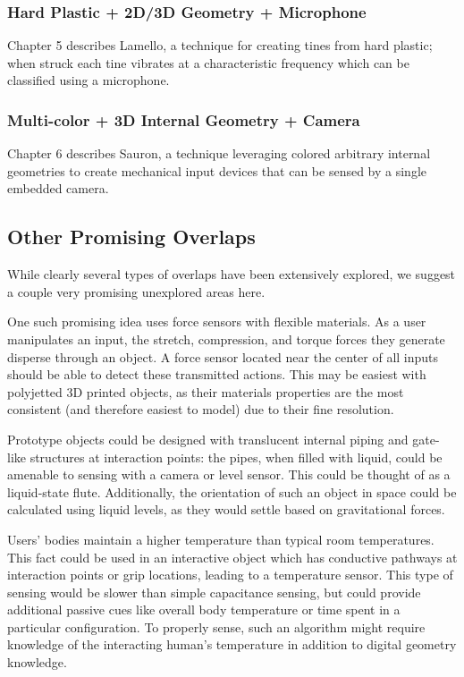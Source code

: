    \subsubsection{Hard Plastic + 2D/3D Geometry + Microphone}
    
    Chapter 5 describes Lamello, a technique for creating tines from hard plastic; when struck each tine vibrates at a characteristic frequency which can be classified using a microphone.
    
    \subsubsection{Multi-color + 3D Internal Geometry + Camera}
    
    Chapter 6 describes Sauron, a technique leveraging colored arbitrary internal geometries to create mechanical input devices that can be sensed by a single embedded camera.

\subsection{Other Promising Overlaps}

    While clearly several types of overlaps have been extensively explored, we suggest a couple very promising unexplored areas here.
    
    One such promising idea uses force sensors with flexible materials. As a user manipulates an input, the stretch, compression, and torque forces they generate disperse through an object. A force sensor located near the center of all inputs should be able to detect these transmitted actions. This may be easiest with polyjetted 3D printed objects, as their materials properties are the most consistent (and therefore easiest to model) due to their fine resolution.
    
    Prototype objects could be designed with translucent internal piping and gate-like structures at interaction points: the pipes, when filled with liquid, could be amenable to sensing with a camera or level sensor. This could be thought of as a liquid-state flute. Additionally, the orientation of such an object in space could be calculated using liquid levels, as they would settle based on gravitational forces.
    
    Users' bodies maintain a higher temperature than typical room temperatures. This fact could be used in an interactive object which has conductive pathways at interaction points or grip locations, leading to a temperature sensor. This type of sensing would be slower than simple capacitance sensing, but could provide additional passive cues like overall body temperature or time spent in a particular configuration. To properly sense, such an algorithm might require knowledge of the interacting human's temperature in addition to digital geometry knowledge.


